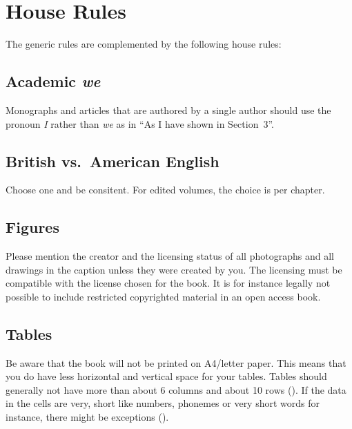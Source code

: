 \section{House Rules}\label{sec:houserules}
The generic rules are complemented by the following house rules:

\subsection{Academic \emph{we}}

Monographs and articles that are authored by a single author should use the pronoun \emph{I} rather
than \emph{we} as in ``As I have shown in Section~3''.	
 

\subsection{British vs.\ American English}
Choose one and be consitent. For edited volumes, the choice is per chapter.  


\subsection{Figures}  
Please mention the creator and the licensing status of all photographs and all drawings in the caption unless they were created by you. The licensing must be compatible with the license chosen for the book. It is for instance legally not possible to include restricted copyrighted material in an open access book. 

\subsection{Tables}
Be aware that the book will not be printed on A4/letter paper. This means that you do have less horizontal and vertical space for your tables. Tables should generally not have more than about 6 columns and about 10 rows (). If the data in the cells are very, short like numbers, phonemes or very short words for instance, there might be exceptions ().



